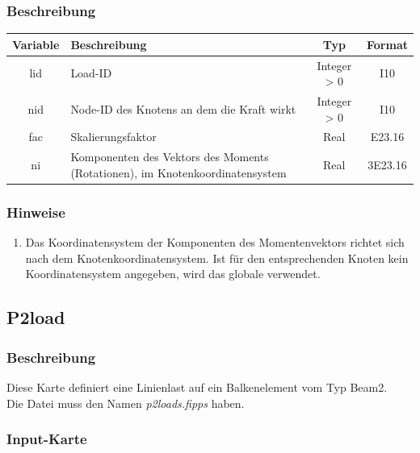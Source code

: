 \documentclass[11pt,titlepage,listof=totoc,bibliography=totoc,twoside]{scrreprt}
\begin{document}
{{\subsubsection{Beschreibung}

\begin{tabularx}{\textwidth}{cXcc}
\toprule
Variable& Beschreibung															& Typ		& Format\\
\midrule
lid		& Load-ID														& Integer > 0	& I10	\\
nid		& Node-ID des Knotens an dem die Kraft wirkt										& Integer > 0	& I10	\\
fac		& Skalierungsfaktor													& Real		& E23.16\\
ni		& Komponenten des Vektors des Moments (Rotationen), im Knotenkoordinatensystem						& Real		& 3E23.16\\
\bottomrule
\end{tabularx}

\subsubsection{Hinweise}

\begin{enumerate}
\item Das Koordinatensystem der Komponenten des Momentenvektors richtet sich nach dem Knotenkoordinatensystem. Ist für den entsprechenden Knoten kein Koordinatensystem angegeben, wird das globale verwendet.
\end{enumerate}

\newpage

\subsection{P2load}

\subsubsection{Beschreibung}

Diese Karte definiert eine Linienlast auf ein Balkenelement vom Typ Beam2.\\
Die Datei muss den Namen \emph{p2loads.fipps} haben.

\subsubsection{Input-Karte}

}}
\end{document}
